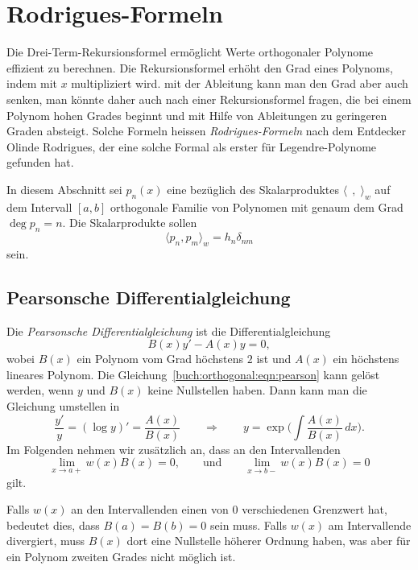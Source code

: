 %
%
%
\section{Rodrigues-Formeln
\label{buch:orthogonalitaet:section:rodrigues}}
Die Drei-Term-Rekursionsformel ermöglicht Werte orthogonaler Polynome
effizient zu berechnen.
Die Rekursionsformel erhöht den Grad eines Polynoms, indem mit $x$ 
multipliziert wird.
mit der Ableitung kann man den Grad aber auch senken, man könnte daher
auch nach einer Rekursionsformel fragen, die bei einem Polynom hohen
Grades beginnt und mit Hilfe von Ableitungen zu geringeren Graden
absteigt.
Solche Formeln heissen {\em Rodrigues-Formeln} nach dem Entdecker Olinde
%
Rodrigues, der eine solche Formal als erster für Legendre-Polynome
gefunden hat.

In diesem Abschnitt sei $p_n(x)$ eine bezüglich des Skalarproduktes
$\langle\,\;,\;\rangle_w$ auf dem Intervall $[a,b]$ orthogonale Familie
von Polynomen mit genaum dem Grad $\deg p_n=n$.
Die Skalarprodukte sollen 
\[
\langle p_n,p_m\rangle_w = h_n\delta_{nm}
\]
sein.

%
%
\subsection{Pearsonsche Differentialgleichung}
Die {\em Pearsonsche Differentialgleichung} ist die Differentialgleichung
\begin{equation}
B(x) y' - A(x) y = 0,
\label{buch:orthogonal:eqn:pearson}
\end{equation}
%
%
wobei $B(x)$ ein Polynom vom Grad höchstens $2$ ist und $A(x)$ ein
höchstens lineares Polynom.
Die Gleichung~\eqref{buch:orthogonal:eqn:pearson}
kann gelöst werden, wenn $y$ und $B(x)$ keine Nullstellen  haben.
Dann kann man die Gleichung umstellen in
\[
\frac{y'}{y}
=
(\log y)'
=
\frac{A(x)}{B(x)}
\qquad\Rightarrow\qquad
y
=
\exp\biggl(
\int\frac{A(x)}{B(x)}
\,dx
\biggr)
.
\]
Im Folgenden nehmen wir zusätzlich an, dass an den Intervallenden
\begin{equation}
\lim_{x\to a+} w(x)B(x) = 0,
\qquad\text{und}\qquad
\lim_{x\to b-} w(x)B(x) = 0
\end{equation}
gilt.

Falls $w(x)$ an den Intervallenden einen von $0$ verschiedenen
Grenzwert hat, bedeutet dies, dass $B(a)=B(b)=0$ sein muss.
Falls $w(x)$ am Intervallende divergiert, muss $B(x)$ dort eine
Nullstelle höherer Ordnung haben, was aber für ein Polynom
zweiten Grades nicht möglich ist.

